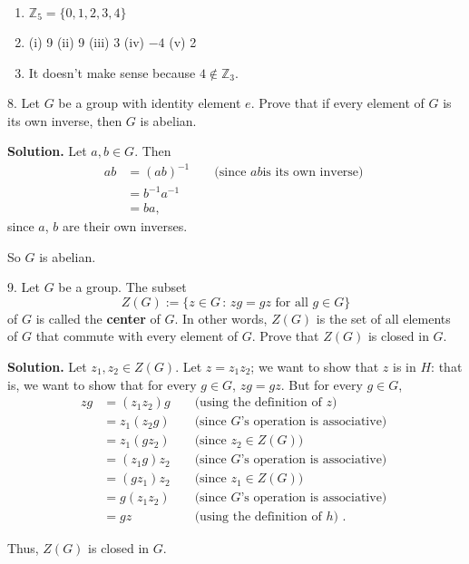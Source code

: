 \documentclass[10pt,]{book}
\newcommand{\terminology}[1]{\textbf{#1}}
\theoremstyle{plain}
\theoremstyle{definition}
\theoremstyle{definition}
\theoremstyle{definition}
\theoremstyle{definition}
\numberwithin{equation}{section}
\def\Z{\mathbb{Z}}
\newcommand{\amp}{&}
\begin{document}
\begin{exerciselist}
\begin{enumerate}[label=(\alph*)]
\item\hypertarget{li-133}{}\(\Z_5=\{0,1,2,3,4\}\)%
\item\hypertarget{li-134}{}(i) 9   (ii) 9   (iii) 3   (iv) \(-4\)   (v) 2%
\item\hypertarget{li-135}{}It doesn't make sense because \(4\not\in \Z_3\).%
\end{enumerate}
%
\item[8.]\hypertarget{exercise-19}{}Let \(G\) be a group with identity element \(e\). Prove that if every element of \(G\) is its own inverse, then \(G\) is abelian.%
\par\smallskip
\par\smallskip
\noindent\textbf{Solution.}\hypertarget{solution-19}{}\quad
Let \(a,b\in G\). Then%
\begin{align*}
ab\amp =(ab)^{-1}\amp \amp \text{ (since \(ab\)
is its own inverse) }\\
\amp =b^{-1}a^{-1}\amp \amp\\
\amp =ba, \amp
\end{align*}
since \(a\), \(b\) are their own inverses.%
\par
So \(G\) is abelian.%
\item[9.]\hypertarget{zgdef}{}\label{notation-46}
 Let \(G\) be a group. The subset%
\begin{equation*}
Z(G):=\{z \in G\,:\, zg=gz \mbox{ for all } g\in G\}
\end{equation*}
of \(G\) is called the \terminology{center} of \(G\). In other words, \(Z(G)\) is the set of all elements of \(G\) that commute with every element of \(G\). Prove that \(Z(G)\) is closed in \(G\).%
\par\smallskip
\par\smallskip
\noindent\textbf{Solution.}\hypertarget{solution-20}{}\quad
Let \(z_1, z_2\in Z(G)\). Let \(z=z_1z_2\); we want to show that \(z\) is in \(H\): that is, we want to show that for every \(g\in G\), \(zg=gz\). But for every \(g\in G\),%
\begin{align*}
zg\amp =(z_1z_2)g\amp \amp  \text{ (using the definition of \(z\)) }\\
\amp =z_1(z_2g)\amp \amp  \text{ (since \(G\)'s operation is associative) }\\
\amp =z_1(gz_2)\amp \amp  \text{ (since \(z_2\in Z(G)\)) }\\
\amp =(z_1g)z_2 \amp \amp  \text{ (since \(G\)'s operation is associative) }\\
\amp =(gz_1)z_2 \amp \amp  \text{ (since \(z_1\in Z(G)\)) }\\
\amp =g(z_1z_2)\amp \amp   \text{ (since \(G\)'s operation is associative) }\\
\amp =gz \amp \amp  \text{ (using the definition of \(h\)) } .
\end{align*}
%
\par
Thus, \(Z(G)\) is closed in \(G\).%
\end{exerciselist}
\typeout{************************************************}
\typeout{************************************************}
\end{document}
